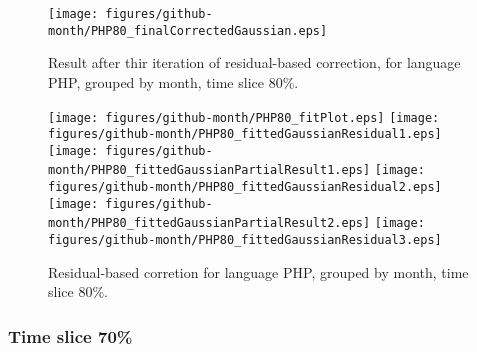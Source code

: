 \begin{figure}[]
\centering
{\texttt{[image: figures/github-month/PHP80\_finalCorrectedGaussian.eps]}}
\caption{Result after thir iteration of residual-based correction, for language PHP, grouped by month, time slice 80\%.}
\end{figure}


\begin{figure}[hb]
\centering
{}
{\texttt{[image: figures/github-month/PHP80\_fitPlot.eps]}}
{\texttt{[image: figures/github-month/PHP80\_fittedGaussianResidual1.eps]}}
{\texttt{[image: figures/github-month/PHP80\_fittedGaussianPartialResult1.eps]}}
{\texttt{[image: figures/github-month/PHP80\_fittedGaussianResidual2.eps]}}
{\texttt{[image: figures/github-month/PHP80\_fittedGaussianPartialResult2.eps]}}
{\texttt{[image: figures/github-month/PHP80\_fittedGaussianResidual3.eps]}}
\caption{Residual-based corretion for language PHP, grouped by month, time slice 80\%.}
\end{figure}


\clearpage 
\newpage 


\FloatBarrier

\subsubsection{Time slice 70\%}

